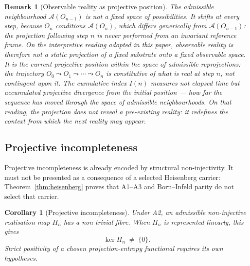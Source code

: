\documentclass[11pt,a4paper]{article}
\newtheorem{corollary}[theorem]{Corollary}
\newtheorem{remark}[theorem]{Remark}
\begin{document}
    \begin{remark}[Observable reality as projective position]
      \label{rem:projective-position}
      The admissible neighbourhood $\mathcal{A}(O_{n-1})$ is not a fixed space of
      possibilities.
      It shifts at every step, because $O_n$ conditions $\mathcal{A}(O_n)$, which differs
      generically from $\mathcal{A}(O_{n-1})$: the projection following step $n$ is never
      performed from an invariant reference frame.
      On the interpretive reading adopted in this paper, observable reality is therefore not a static
      projection of a fixed substrate onto a fixed observable space.
      It is the \emph{current projective position within the space of admissible reprojections}:
      the trajectory $O_0 \leadsto O_1 \leadsto \cdots \leadsto O_n$ is constitutive of
      what is real at step $n$, not contingent upon it.
      The cumulative index $I(n)$ measures not elapsed time but accumulated projective
      divergence from the initial position — how far the sequence has moved through the
      space of admissible neighbourhoods.
      On that reading, the projection does not reveal a pre-existing reality: it redefines the
      context from which the next reality may appear.
    \end{remark}

  \subsection{Projective incompleteness}
    \label{subsec:projective-incompleteness}

    Projective incompleteness is already encoded by structural non-injectivity.
    It must not be presented as a consequence of a selected Heisenberg carrier:
    Theorem~\ref{thm:heisenberg} proves that A1--A3 and Born--Infeld parity do not
    select that carrier.

    \begin{corollary}[Projective incompleteness]
      \label{cor:projective-incompleteness}
      Under A2, an admissible non-injective realisation map $\Pi_n$ has a
      non-trivial fibre.
      When $\Pi_n$ is represented linearly, this gives
      \begin{equation}
        \label{eq:projective-incompleteness}
        \ker \Pi_n \;\neq\; \{0\}.
      \end{equation}
      Strict positivity of a chosen projection-entropy functional requires its
      own hypotheses.
    \end{corollary}
\end{document}
